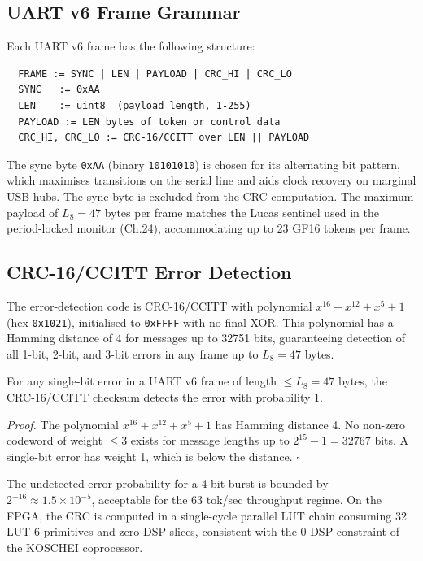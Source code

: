 \subsection{UART v6 Frame Grammar}\label{fa_32:subsec:frame-grammar}

Each UART v6 frame has the following structure:

\begin{verbatim}
  FRAME := SYNC | LEN | PAYLOAD | CRC_HI | CRC_LO
  SYNC   := 0xAA
  LEN    := uint8  (payload length, 1-255)
  PAYLOAD := LEN bytes of token or control data
  CRC_HI, CRC_LO := CRC-16/CCITT over LEN || PAYLOAD
\end{verbatim}

The sync byte \texttt{0xAA} (binary \texttt{10101010}) is chosen for its alternating bit pattern, which maximises transitions on the serial line and aids clock recovery on marginal USB hubs. The sync byte is excluded from the CRC computation. The maximum payload of \(L_8 = 47\) bytes per frame matches the Lucas sentinel used in the period-locked monitor (Ch.24), accommodating up to 23 GF16 tokens per frame.

\subsection{CRC-16/CCITT Error Detection}\label{fa_32:subsec:crc}

The error-detection code is CRC-16/CCITT with polynomial \(x^{16} + x^{12} + x^5 + 1\) (hex \texttt{0x1021}), initialised to \texttt{0xFFFF} with no final XOR. This polynomial has a Hamming distance of 4 for messages up to 32751 bits, guaranteeing detection of all 1-bit, 2-bit, and 3-bit errors in any frame up to \(L_8 = 47\) bytes.

\begin{proposition}
\label{fa_32:prop:crc-complete}
For any single-bit error in a UART v6 frame of length \(\leq L_8 = 47\) bytes, the CRC-16/CCITT checksum detects the error with probability 1.
\end{proposition}

\emph{Proof.} The polynomial \(x^{16} + x^{12} + x^5 + 1\) has Hamming distance 4. No non-zero codeword of weight \(\leq 3\) exists for message lengths up to \(2^{15} - 1 = 32767\) bits. A single-bit error has weight 1, which is below the distance. \(\square\)

The undetected error probability for a 4-bit burst is bounded by \(2^{-16} \approx 1.5 \times 10^{-5}\), acceptable for the 63 tok/sec throughput regime. On the FPGA, the CRC is computed in a single-cycle parallel LUT chain consuming 32 LUT-6 primitives and zero DSP slices, consistent with the 0-DSP constraint of the KOSCHEI coprocessor.

